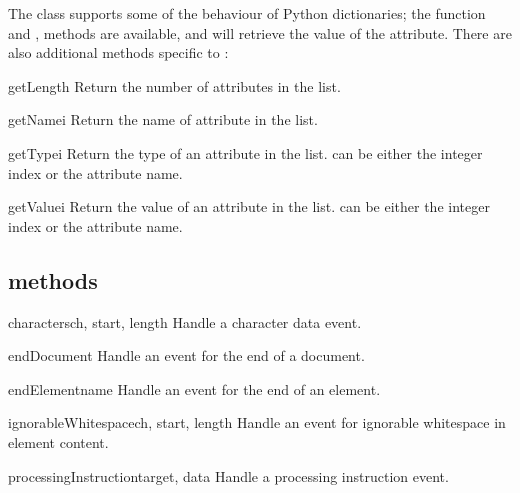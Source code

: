 \documentclass{howto}
\newcommand{\attribute}[1]{\code{#1}}
\begin{document}
The  class supports some of the behaviour of
Python dictionaries; the  function and ,
 methods are available, and  will
retrieve the value of the \attribute{href} attribute.  There are also
additional methods specific to :

\begin{methoddesc}{getLength}{}
Return the number of attributes in the list.
\end{methoddesc}

\begin{methoddesc}{getName}{i}
Return the name of attribute  in the list.
\end{methoddesc}

\begin{methoddesc}{getType}{i}
Return the type of an attribute in the list.  can be
either the integer index or the attribute name.
\end{methoddesc}

\begin{methoddesc}{getValue}{i}
Return the value of an attribute in the list.  can be
either the integer index or the attribute name.
\end{methoddesc}

\subsection{ methods}

\begin{methoddesc}{characters}{ch, start, length}
Handle a character data event.
\end{methoddesc}

\begin{methoddesc}{endDocument}{}
Handle an event for the end of a document.
\end{methoddesc}

\begin{methoddesc}{endElement}{name}
Handle an event for the end of an element.
\end{methoddesc}

\begin{methoddesc}{ignorableWhitespace}{ch, start, length}
Handle an event for ignorable whitespace in element content.
\end{methoddesc}

\begin{methoddesc}{processingInstruction}{target, data}
Handle a processing instruction event.
\end{methoddesc}
\end{document}
